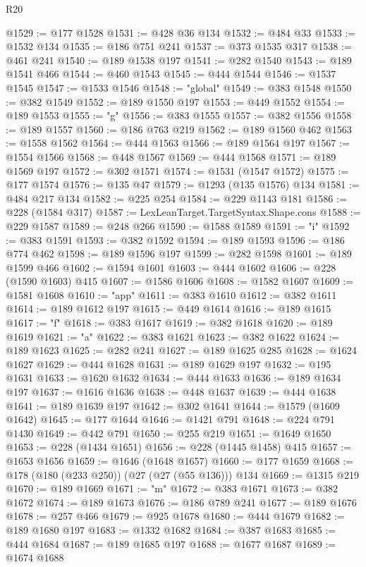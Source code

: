 \begin{lexlean}{R20}
\begin{coremodule}
@1529 := @177 @1528
@1531 := @428 @36 @134
@1532 := @484 @33
@1533 := @1532 @134
@1535 := @186 @751 @241
@1537 := @373 @1535 @317
@1538 := @461 @241
@1540 := @189 @1538 @197
@1541 := @282 @1540
@1543 := @189 @1541 @466
@1544 := @460 @1543
@1545 := @444 @1544
@1546 := @1537 @1545
@1547 := @1533 @1546
@1548 := "global"
@1549 := @383 @1548
@1550 := @382 @1549
@1552 := @189 @1550 @197
@1553 := @449 @1552
@1554 := @189 @1553
@1555 := "g"
@1556 := @383 @1555
@1557 := @382 @1556
@1558 := @189 @1557
@1560 := @186 @763 @219
@1562 := @189 @1560 @462
@1563 := @1558 @1562
@1564 := @444 @1563
@1566 := @189 @1564 @197
@1567 := @1554 @1566
@1568 := @448 @1567
@1569 := @444 @1568
@1571 := @189 @1569 @197
@1572 := @302 @1571
@1574 := @1531 (@1547 @1572)
@1575 := @177 @1574
@1576 := @135 @47
@1579 := @1293 (@135 @1576) @134
@1581 := @484 @217 @134
@1582 := @225 @254
@1584 := @229 @1143 @181
@1586 := @228 (@1584 @317)
@1587 := LexLeanTarget.TargetSyntax.Shape.cons
@1588 := @229 @1587
@1589 := @248 @266
@1590 := @1588 @1589
@1591 := "i"
@1592 := @383 @1591
@1593 := @382 @1592
@1594 := @189 @1593
@1596 := @186 @774 @462
@1598 := @189 @1596 @197
@1599 := @282 @1598
@1601 := @189 @1599 @466
@1602 := @1594 @1601
@1603 := @444 @1602
@1606 := @228 (@1590 @1603) @415
@1607 := @1586 @1606
@1608 := @1582 @1607
@1609 := @1581 @1608
@1610 := "app"
@1611 := @383 @1610
@1612 := @382 @1611
@1614 := @189 @1612 @197
@1615 := @449 @1614
@1616 := @189 @1615
@1617 := "f"
@1618 := @383 @1617
@1619 := @382 @1618
@1620 := @189 @1619
@1621 := "a"
@1622 := @383 @1621
@1623 := @382 @1622
@1624 := @189 @1623
@1625 := @282 @241
@1627 := @189 @1625 @285
@1628 := @1624 @1627
@1629 := @444 @1628
@1631 := @189 @1629 @197
@1632 := @195 @1631
@1633 := @1620 @1632
@1634 := @444 @1633
@1636 := @189 @1634 @197
@1637 := @1616 @1636
@1638 := @448 @1637
@1639 := @444 @1638
@1641 := @189 @1639 @197
@1642 := @302 @1641
@1644 := @1579 (@1609 @1642)
@1645 := @177 @1644
@1646 := @1421 @791
@1648 := @224 @791 @1430
@1649 := @442 @791
@1650 := @255 @219
@1651 := @1649 @1650
@1653 := @228 (@1434 @1651)
@1656 := @228 (@1445 @1458) @415
@1657 := @1653 @1656
@1659 := @1646 (@1648 @1657)
@1660 := @177 @1659
@1668 := @178 (@180 (@233 @250)) (@27 (@27 (@55 @136))) @134
@1669 := @1315 @219
@1670 := @189 @1669
@1671 := "m"
@1672 := @383 @1671
@1673 := @382 @1672
@1674 := @189 @1673
@1676 := @186 @789 @241
@1677 := @189 @1676
@1678 := @257 @466
@1679 := @925 @1678
@1680 := @444 @1679
@1682 := @189 @1680 @197
@1683 := @1332 @1682
@1684 := @387 @1683
@1685 := @444 @1684
@1687 := @189 @1685 @197
@1688 := @1677 @1687
@1689 := @1674 @1688

\end{coremodule}
\end{lexlean}
